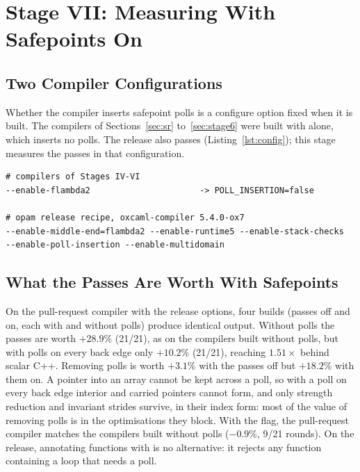 \section{Stage VII: Measuring With Safepoints On}
\label{sec:reality}

\subsection{Two Compiler Configurations}
Whether the compiler inserts safepoint polls is a configure option fixed when
it is built. The compilers of Sections~\ref{sec:sr} to~\ref{sec:stage6} were
built with  alone, which inserts no polls. The release
also passes  (Listing~\ref{lst:config}); this
stage measures the passes in that configuration.

\begin{lstlisting}[language=plaintext,caption={Configure options of the compilers of Stages IV--VI (top) and of the opam OxCaml release (bottom).},label=lst:config,numbers=none]
# compilers of Stages IV-VI
--enable-flambda2                      -> POLL_INSERTION=false

# opam release recipe, oxcaml-compiler 5.4.0-ox7
--enable-middle-end=flambda2 --enable-runtime5 --enable-stack-checks
--enable-poll-insertion --enable-multidomain
\end{lstlisting}

\subsection{What the Passes Are Worth With Safepoints}
\label{tab:pollladder}
On the pull-request compiler with the release options, four builds (passes
off and on, each with and without polls) produce identical output. Without
polls the
passes are worth $+28.9\%$ (21/21), as on the compilers built
without polls, but with polls on every back edge only
$+10.2\%$ (21/21), reaching $1.51\times$ behind scalar C++. Removing polls is
worth $+3.1\%$ with the passes off but $+18.2\%$
with them on. A pointer into an
array cannot be kept across a poll, so with a poll on every back edge interior
and carried pointers cannot form, and only strength reduction and invariant
strides survive, in their index form: most of the value of removing polls is
in the optimisations they block. With the flag, the pull-request compiler
matches the compilers built without polls ($-0.9\%$,
9/21 rounds). On the release, annotating functions with
 is no alternative: it rejects any function containing a
loop that needs a poll.

